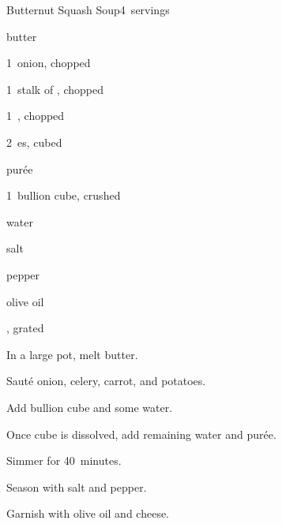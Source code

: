 \begin{recipe}{Butternut Squash Soup}{}{4~servings}

\begin{ingredients}
\item {} butter
\item 1~onion, chopped
\item 1~stalk of , chopped
\item 1~, chopped
\item 2~es, cubed
\item {}  purée
\item 1~bullion cube, crushed
\item {} water
\item salt
\item pepper
\item olive oil
\item {}, grated
\end{ingredients}

\begin{directions}
\item In a large pot, melt butter.
\item Sauté onion, celery, carrot, and potatoes.
\item Add bullion cube and some water.
\item Once cube is dissolved, add remaining water and purée.
\item Simmer for 40~minutes.
\item Season with salt and pepper.
\item Garnish with olive oil and cheese.
\end{directions}

\end{recipe}
